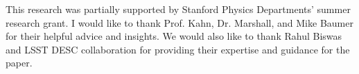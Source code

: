 % 

This research was partially supported by Stanford Physics Departments' summer research grant. I would like to thank Prof. Kahn, Dr. Marshall, and Mike Baumer for their helpful advice and insights. We would also like to thank Rahul Biswas and LSST DESC collaboration for providing their expertise and guidance for the paper.

% 

